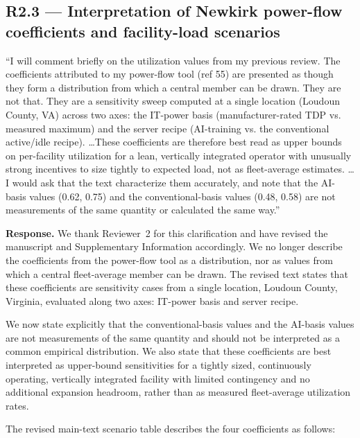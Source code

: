 \documentclass[11pt]{article}
\newenvironment{revquote}{%
  \begin{mdframed}[
    leftmargin=0.5em,
    rightmargin=0.5em,
    linewidth=0pt,
    backgroundcolor=gray!8,
    skipabove=0.5em,
    skipbelow=0.5em,
    innertopmargin=0.6em,
    innerbottommargin=0.6em,
    innerleftmargin=0.8em,
    innerrightmargin=0.8em
  ]%
  \itshape%
}{%
  \end{mdframed}%
}
\begin{document}
\subsection*{R2.3 --- Interpretation of Newkirk power-flow coefficients and facility-load scenarios}

\begin{revquote}
``I will comment briefly on the utilization values from my previous review. The coefficients attributed to my power-flow tool (ref 55) are presented as though they form a distribution from which a central member can be drawn. They are not that. They are a sensitivity sweep computed at a single location (Loudoun County, VA) across two axes: the IT-power basis (manufacturer-rated TDP vs. measured maximum) and the server recipe (AI-training vs. the conventional active/idle recipe). \ldots These coefficients are therefore best read as upper bounds on per-facility utilization for a lean, vertically integrated operator with unusually strong incentives to size tightly to expected load, not as fleet-average estimates. \ldots I would ask that the text characterize them accurately, and note that the AI-basis values (0.62, 0.75) and the conventional-basis values (0.48, 0.58) are not measurements of the same quantity or calculated the same way.''
\end{revquote}

\textbf{Response.} We thank Reviewer~2 for this clarification and have revised the manuscript and Supplementary Information accordingly. We no longer describe the coefficients from the power-flow tool as a distribution, nor as values from which a central fleet-average member can be drawn. The revised text states that these coefficients are sensitivity cases from a single location, Loudoun County, Virginia, evaluated along two axes: IT-power basis and server recipe.

We now state explicitly that the conventional-basis values and the AI-basis values are not measurements of the same quantity and should not be interpreted as a common empirical distribution. We also state that these coefficients are best interpreted as upper-bound sensitivities for a tightly sized, continuously operating, vertically integrated facility with limited contingency and no additional expansion headroom, rather than as measured fleet-average utilization rates.

The revised main-text scenario table describes the four coefficients as follows:
\end{document}
